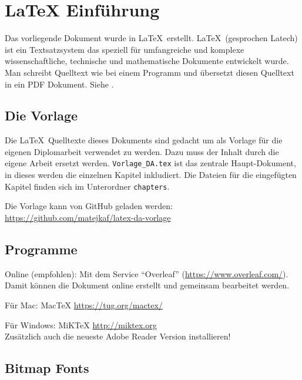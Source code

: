 \chapter{LaTeX Einführung}

Das vorliegende Dokument wurde in \LaTeX\ erstellt.
\LaTeX\ (gesprochen Latech) ist ein Textsatzsystem das speziell für umfangreiche  und komplexe wissenschaftliche, technische und mathematische Dokumente entwickelt wurde.
Man schreibt Quelltext wie bei einem Programm und übersetzt diesen Quelltext in ein PDF Dokument.
Siehe \cite{bib:latexintro}.
 
\section{Die Vorlage}

Die \LaTeX\ Quelltexte dieses Dokuments sind gedacht um als Vorlage für die eigenen Diplomarbeit verwendet zu werden.
Dazu muss der Inhalt durch die eigene Arbeit ersetzt werden.
\verb+Vorlage_DA.tex+ ist das zentrale Haupt-Dokument, in dieses werden die einzelnen Kapitel inkludiert. Die Dateien für die eingefügten Kapitel finden sich im Unterordner \verb+chapters+.

Die Vorlage kann von GitHub geladen werden:
\url{https://github.com/matejkaf/latex-da-vorlage}

\section{Programme}

Online (empfohlen):
Mit dem Service "`Overleaf"' (\url{https://www.overleaf.com/}). Damit können die Dokument online erstellt und gemeinsam bearbeitet werden.

Für Mac: MacTeX
\url{https://tug.org/mactex/}

Für Windows: MiKTeX
\url{http://miktex.org}\\
Zusätzlich auch die neueste Adobe Reader Version installieren!



\section{Bitmap Fonts}


